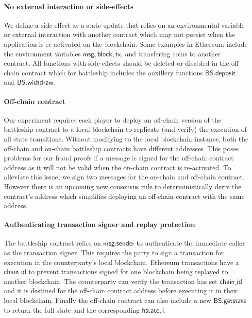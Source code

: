 \documentclass{llncs}
\newcommand{\hstate}{\mathsf{hstate}}
\newcommand{\monotoniccounter}{\mathsf{i}}
\newcommand{\battleshipdeposit}{\mathsf{BS.deposit}}
\newcommand{\battleshipwithdraw}{\mathsf{BS.withdraw}}
\newcommand{\battleshipgetstate}{\mathsf{BS.getstate}}
\begin{document}
	\paragraph{No external interaction or side-effects}   \label{sec:sideffectshandle}
	We define a side-effect as a state update that relies on an environmental variable or external interaction with another contract which may not persist when the application is re-activated on the blockchain. 
	Some examples in Ethereum include the environment variables $\mathsf{msg}, \mathsf{block}, \mathsf{tx}$, and transfering coins to another contract. 
	All functions with side-effects should be deleted or disabled in the off-chain contract which for battleship includes the auxillery functions $\battleshipdeposit$ and $\battleshipwithdraw$.  

	
	\paragraph{Off-chain contract}

	Our experiment requires each player to deploy an off-chain version of the battleship contract to a local blockchain to replicate (and verify) the execution of all state transitions. 
	Without modifying to the local blockchain instance, both the off-chain and on-chain battleship contracts have different addresses.
	This poses problems for our fraud proofs if a message is signed for the off-chain contract address as it will not be valid when the on-chain contract is re-activated.
	To alleviate this issue, we sign two messages for the on-chain and off-chain contract.
	However there is an upcoming new consensus rule  \cite{eip1014} to deterministically deriv the contract's address which simplifies deploying an off-chain contract with the same address. 
	
	\paragraph{Authenticating transaction signer and replay protection} 
	The battleship contract relies on $\mathsf{msg.sender}$ to authenticate the immediate caller as the transaction signer.
	This requires the party to sign a transaction for execution in the counterparty's local blockchain. 
	Ethereum transactions have a $\mathsf{chain\_id}$ to prevent transactions signed for one blockchain being replayed to another blockchain.
	The counterparty can verify the transaction has set  $\mathsf{chain\_id}$  and it is destined for the off-chain contract address before executing it in their local blockchain. 
	Finally the off-chain contract can also include a new $\battleshipgetstate$ to return the full state and the corresponding $\hstate,\monotoniccounter$. 
\end{document}
